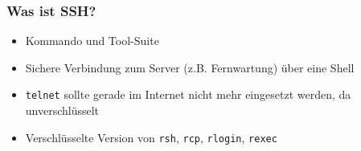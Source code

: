 \begin{frame}
\frametitle{Was ist SSH?}
\begin{itemize}
\item Kommando und Tool-Suite 
\pause
\item Sichere Verbindung zum Server (z.B. Fernwartung) über eine Shell
\pause 
\item \texttt{telnet} sollte gerade im Internet nicht mehr eingesetzt werden, da unverschlüsselt
\pause
\item Verschlüsselte Version von \texttt{rsh}, \texttt{rcp}, \texttt{rlogin}, \texttt{rexec}
\end{itemize}
\end{frame}